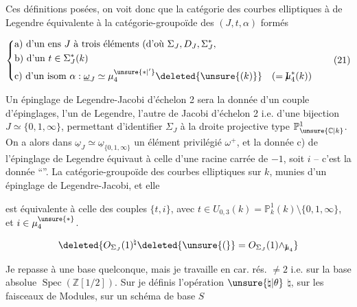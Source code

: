 Ces définitions posées, on voit donc que la catégorie des courbes elliptiques à  de Legendre   équivalente à la catégorie-groupoïde des   $(J,t,\alpha)$  formés

\[
\left\{\begin{aligned}
&\text{a) d'un ens }J\text{ à trois éléments (d'où }\Sigma_J,D_J,\Sigma_J^*,\\
&\text{b) d'un } t\in\Sigma_J^*(k)\\
&\text{c) d'un isom }\alpha:\underline{\omega}_J\simeq\mu_4^{\unsure{*|'}}\deleted{\unsure{(k)}}\quad(=\mathord{\mathrm{I}\mkern-7mu\mu}_4^*(k))
\end{aligned}\right.
\tag*{(21)}
\]

Un épinglage de Legendre-Jacobi d'échelon 2  sera la donnée d'un couple d'épinglages, l'un de Legendre, l'autre de Jacobi d'échelon 2 i.e. d'une bijection $J\simeq\{0,1,\infty\}$, permettant d'identifier $\Sigma_J$ à la droite projective type $\mathbb{P}^1_{\unsure{\mathbb{C}|k}}$. On a alors dans $\underline{\omega}_J\simeq\underline{\omega}_{\{0,1,\infty\}}$ un élément privilégié $\omega^+$, et la donnée c)  de l'épinglage de Legendre équivaut  à celle d'une racine carrée  de $-1$, soit $i$ -- c'est la donnée ``''.  La catégorie-groupoïde des courbes elliptiques sur $k$, munies d'un épinglage de Legendre-Jacobi,   et elle

est équivalente à celle des couples $\{t,i\}$, avec $t\in U_{0,3}(k)=\mathbb P^1_k(k)\setminus\{0,1,\infty\}$, et $i\in\mu_4^{\unsure{*}}$.


\[
\deleted{O_{\Sigma_J}(1)^{\natural}\deleted{\unsure{(}}=O_{\Sigma_J}(1)\wedge_{\mathord{\mathrm{I}\mkern-7mu\mu}_4}}
\]

Je repasse à une base quelconque, mais je travaille en car. rés. $\ne 2$ i.e. sur la base absolue $\operatorname{Spec}(\mathbb Z[1/2])$. Sur  je définis l'opération $\unsure{\natural|\theta}$ $\natural$, sur les  faisceaux de Modules,  sur un schéma de base $S$

